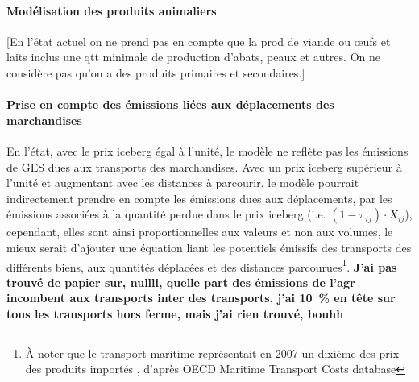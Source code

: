 \paragraph{Modélisation des produits animaliers} [En l'état actuel on ne prend pas en compte que la prod de viande ou œufs et laits inclus une qtt minimale de production d'abats, peaux et autres. On ne considère pas qu'on a des produits primaires et secondaires.]

\paragraph{Prise en compte des émissions liées aux déplacements des marchandises} En l'état, avec le prix iceberg égal à l'unité, le modèle ne reflète pas les émissions de GES dues aux transports des marchandises. Avec un prix iceberg supérieur à l'unité et augmentant avec les distances à parcourir, le modèle pourrait indirectement prendre en compte les émissions dues aux déplacements, par les émissions associées à la quantité perdue dans le prix iceberg (i.e. $(1 - \pi_{ij}) \cdot X_{ij}$), cependant, elles sont ainsi proportionnelles aux valeurs et non aux volumes, le mieux serait d'ajouter une équation liant les potentiels émissifs des transports des différents biens, aux quantités déplacées et des distances parcourues\footnote{À noter que le transport maritime représentait en 2007 un dixième des prix des produits importés \cite{Korinek2010}, d'après OECD Maritime Transport Costs database}. \textbf{J'ai pas trouvé de papier sur, nullll, quelle part des émissions de l'agr incombent aux transports inter des transports. j'ai 10~\% en tête sur tous les transports hors ferme, mais j'ai rien trouvé, bouhh}